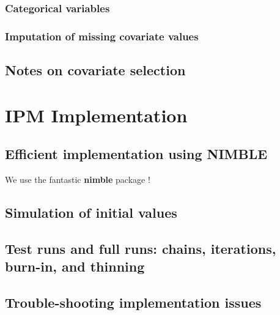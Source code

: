 \documentclass[
]{book}
\begin{document}
\hypertarget{categorical-variables}{%
\subsection{Categorical variables}\label{categorical-variables}}

\hypertarget{imputation-of-missing-covariate-values}{%
\subsection{Imputation of missing covariate values}\label{imputation-of-missing-covariate-values}}

\hypertarget{notes-on-covariate-selection}{%
\section{Notes on covariate selection}\label{notes-on-covariate-selection}}

\hypertarget{IPMImp}{%
\chapter{IPM Implementation}\label{IPMImp}}

\hypertarget{efficient-implementation-using-nimble}{%
\section{Efficient implementation using NIMBLE}\label{efficient-implementation-using-nimble}}

We use the fantastic \textbf{nimble} package \citep{devalpine2017}!

\hypertarget{simulation-of-initial-values}{%
\section{Simulation of initial values}\label{simulation-of-initial-values}}

\hypertarget{test-runs-and-full-runs-chains-iterations-burn-in-and-thinning}{%
\section{Test runs and full runs: chains, iterations, burn-in, and thinning}\label{test-runs-and-full-runs-chains-iterations-burn-in-and-thinning}}

\hypertarget{trouble-shooting-implementation-issues}{%
\section{Trouble-shooting implementation issues}\label{trouble-shooting-implementation-issues}}
\end{document}
